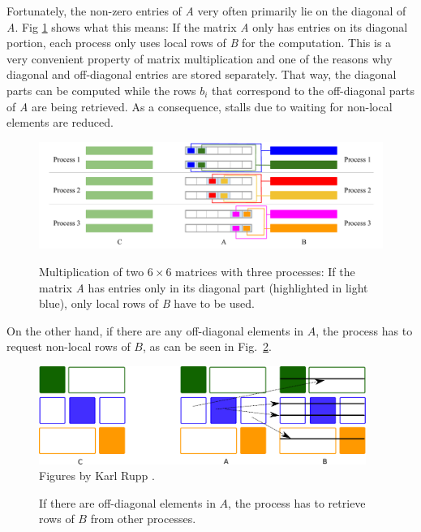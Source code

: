 Fortunately, the non-zero entries of \textit{A} very often primarily lie on the diagonal of \textit{A}. Fig \ref{fig:matmult_diagonal} shows what this means: If the matrix \textit{A} only has entries on its diagonal portion, each process only uses local rows of \textit{B} for the computation. This is a very convenient property of matrix multiplication and one of the reasons why diagonal and off-diagonal entries are stored separately. That way, the diagonal parts can be computed while the rows $b_i$ that correspond to the off-diagonal parts of \textit{A} are being retrieved. As a consequence, stalls due to waiting for non-local elements are reduced. 

\begin{figure}[tb]
\centering
{\includegraphics[width=1.05\textwidth]{matrix_multiplication_diagonal}}
\caption{Multiplication of two $6\times 6$ matrices with three processes: If the matrix \textit{A} has entries only in its diagonal part (highlighted in light blue), only local rows of \textit{B} have to be used.}
\label{fig:matmult_diagonal}
\end{figure}

On the other hand, if there are any off-diagonal elements in $A$, the process has to request non-local rows of $B$, as can be seen in Fig.~\ref{fig:parallel-2}. 


\begin{figure}[tb]
\centering
\vspace{5mm}
{\includegraphics[width=0.95\textwidth]{parallel/spgemm-parallel-2} Figures by Karl Rupp \cite{karli_LANS_image}.}
\caption{If there are off-diagonal elements in $A$, the process has to retrieve rows of $B$ from other processes.}
\label{fig:parallel-2}
\end{figure}



